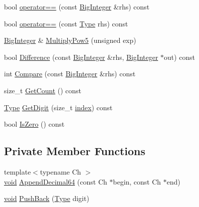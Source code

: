 \begin{DoxyCompactItemize}
bool \hyperlink{classinternal_1_1BigInteger_a52b424669238bdebc134e793d3b470ae}{operator==} (const \hyperlink{classinternal_1_1BigInteger}{Big\+Integer} \&rhs) const
\item 
bool \hyperlink{classinternal_1_1BigInteger_a8b6ab0d652d461c1136e0388d352628b}{operator==} (const \hyperlink{classinternal_1_1BigInteger_a1310812fca26ebae77594ba08678fc4c}{Type} rhs) const
\item 
\hyperlink{classinternal_1_1BigInteger}{Big\+Integer} \& \hyperlink{classinternal_1_1BigInteger_a98a13f169c27d1acfa57054f37c61763}{Multiply\+Pow5} (unsigned exp)
\item 
bool \hyperlink{classinternal_1_1BigInteger_ad7ad62e6b62af38283ee940eb4015b26}{Difference} (const \hyperlink{classinternal_1_1BigInteger}{Big\+Integer} \&rhs, \hyperlink{classinternal_1_1BigInteger}{Big\+Integer} $\ast$out) const
\item 
int \hyperlink{classinternal_1_1BigInteger_af8e90fff5382de6c1cda5f751017200c}{Compare} (const \hyperlink{classinternal_1_1BigInteger}{Big\+Integer} \&rhs) const
\item 
size\+\_\+t \hyperlink{classinternal_1_1BigInteger_aa0ad6e74839b7c7fe77c9742ec079525}{Get\+Count} () const
\item 
\hyperlink{classinternal_1_1BigInteger_a1310812fca26ebae77594ba08678fc4c}{Type} \hyperlink{classinternal_1_1BigInteger_a7288eefd49735c3c3edec698f56738bd}{Get\+Digit} (size\+\_\+t \hyperlink{imgui__impl__opengl3__loader_8h_a57f14e05b1900f16a2da82ade47d0c6d}{index}) const
\item 
bool \hyperlink{classinternal_1_1BigInteger_ae12dd6759f1f76501db3d1bcafce39cd}{Is\+Zero} () const
\end{DoxyCompactItemize}
\subsection*{Private Member Functions}
\begin{DoxyCompactItemize}
\item 
{\footnotesize template$<$typename Ch $>$ }\\\hyperlink{imgui__impl__opengl3__loader_8h_ac668e7cffd9e2e9cfee428b9b2f34fa7}{void} \hyperlink{classinternal_1_1BigInteger_adcdffd9049832290ce37e283c51e2f50}{Append\+Decimal64} (const Ch $\ast$begin, const Ch $\ast$end)
\item 
\hyperlink{imgui__impl__opengl3__loader_8h_ac668e7cffd9e2e9cfee428b9b2f34fa7}{void} \hyperlink{classinternal_1_1BigInteger_a18a4939a983f296085fed6bc5b56d5c1}{Push\+Back} (\hyperlink{classinternal_1_1BigInteger_a1310812fca26ebae77594ba08678fc4c}{Type} digit)
\end{DoxyCompactItemize}
